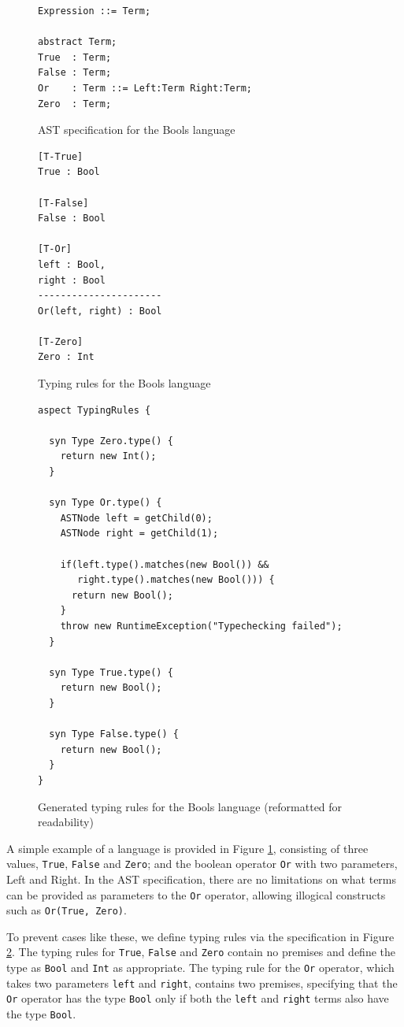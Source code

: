 \documentclass[nofilelist]{cslthse-msc}
\begin{document}
\begin{figure}[]
\begin{lstlisting}[]
Expression ::= Term;

abstract Term;
True  : Term;
False : Term;
Or    : Term ::= Left:Term Right:Term;
Zero  : Term;
\end{lstlisting}
  \caption{AST specification for the Bools language}
  \label{boolsast}
\end{figure}
\begin{figure}[]
\begin{lstlisting}[]
[T-True]
True : Bool

[T-False]
False : Bool

[T-Or]
left : Bool,
right : Bool
----------------------
Or(left, right) : Bool

[T-Zero]
Zero : Int
\end{lstlisting}
  \caption{Typing rules for the Bools language}
  \label{boolstr}
\end{figure}

\begin{figure}[]
\begin{lstlisting}[language=jrag]
aspect TypingRules {

  syn Type Zero.type() {
    return new Int();
  }

  syn Type Or.type() {
    ASTNode left = getChild(0);
    ASTNode right = getChild(1);

    if(left.type().matches(new Bool()) &&
       right.type().matches(new Bool())) {
      return new Bool();
    }
    throw new RuntimeException("Typechecking failed");
  }

  syn Type True.type() {
    return new Bool();
  }

  syn Type False.type() {
    return new Bool();
  }
}
\end{lstlisting}
\caption{Generated typing rules for the Bools language (reformatted for readability)}
  \label{boolstrgen}
\end{figure}
A simple example of a language is provided in Figure \ref{boolsast}, consisting of three values, \lstinline{True}, \lstinline{False} and \lstinline{Zero}; and the boolean operator \lstinline{Or} with two parameters, Left and Right.
In the AST specification, there are no limitations on what terms can be provided as parameters to the \lstinline{Or} operator, allowing illogical constructs such as \lstinline{Or(True, Zero)}.

To prevent cases like these, we define typing rules via the specification in Figure \ref{boolstr}.
The typing rules for \lstinline{True}, \lstinline{False} and \lstinline{Zero} contain no premises and define the type as \lstinline{Bool} and \lstinline{Int} as appropriate.
The typing rule for the \lstinline{Or} operator, which takes two parameters \lstinline{left} and \lstinline{right}, contains two premises, specifying that the \lstinline{Or} operator has the type \lstinline{Bool} only if both the \lstinline{left} and \lstinline{right} terms also have the type \lstinline{Bool}.
\end{document}
